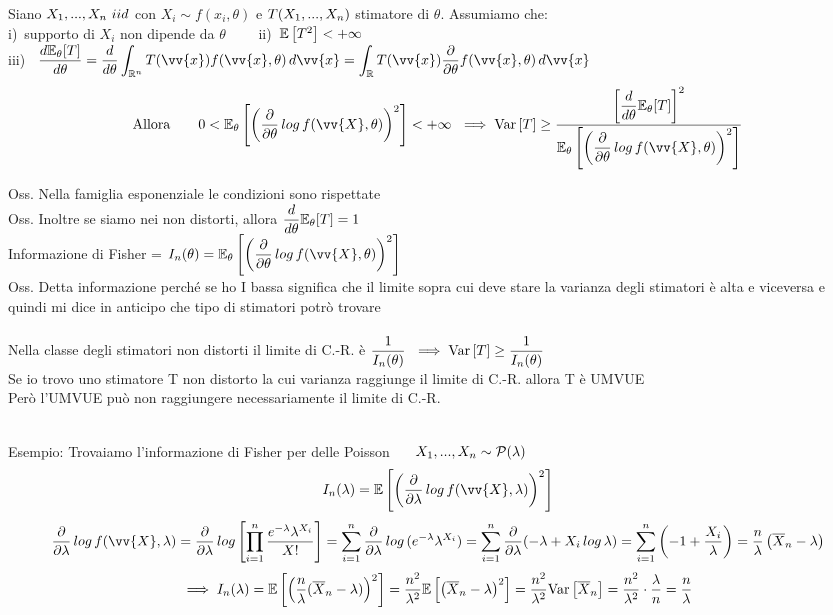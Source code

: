 \begin{teo}
Siano $X_1,...,X_n \ iid $ con $ X_i\sim f(x_i,\theta) $ e $ T(X_1,...,X_n)$ stimatore di $\theta$. Assumiamo che:\\
i)\ supporto di $X_i$ non dipende da $\theta$ \ \ \ \ ii)\ $\mathbb{E} \left[ T^2 \right]<+\infty$ \smallskip \\
iii) \ $\frac{d \EE_{\theta}[T]}{d\theta}=\frac{d}{d\theta}\displaystyle\int_{\R^n} T(\vv{x})f(\vv{x},\theta)\,d\vv{x}=\int_{\R}T(\vv{x})\frac{\partial}{\partial \theta}f(\vv{x},\theta)\,d\vv{x}$
\[ \text{Allora} \ \ \ \ \ \ 0<\EE_{\theta}\OO\O\frac{\partial}{\partial\theta}\,log \,f(\vv{X},\theta)\C^2\CC<+\infty \ \implies \var{T}\ge\frac{\OO\frac{d}{d\theta}\EE_{\theta}[T]\CC^2}{\EE_{\theta}\OO\O\frac{\partial}{\partial\theta}\,log\,f(\vv{X},\theta)\C^2\CC}\]
\end{teo}

%
Oss. Nella famiglia esponenziale le condizioni sono rispettate\\
Oss. Inoltre se siamo nei non distorti, allora  $\dfrac{d}{d\theta}\mathbb E_{\theta}[T] =1$\\

Informazione di Fisher = $I_n(\theta)=\EE_{\theta}\OO\O\frac{\partial}{\partial\theta}\,log\,f(\vv{X},\theta)\C^2\CC$\\
Oss. Detta informazione perché se ho I bassa significa che il limite sopra cui deve stare la varianza degli stimatori è alta e viceversa e quindi mi dice in anticipo che tipo di stimatori potrò trovare \\ \\

Nella classe degli stimatori non distorti il limite di C.-R. è $\dfrac{1}{I_n(\theta)} \ \implies \text{Var} \left[ T \right]\ge\dfrac{1}{I_n(\theta)}$\\

Se io trovo uno stimatore T non distorto la cui varianza raggiunge il limite di C.-R. allora T è UMVUE\\
Però l'UMVUE può non raggiungere necessariamente il limite di C.-R.\\ \\




Esempio: Trovaiamo l'informazione di Fisher per delle Poisson \ \ \ $X_1,...,X_n\sim\mathcal P(\lambda)$ \[I_n(\lambda)=\E{\O\frac{\partial}{\partial \lambda}\,log\,f(\vv{X},\lambda)\C^2}
\]
\[\frac{\partial}{\partial\lambda}\,log\,f(\vv{X},\lambda)=\frac{\partial}{\partial\lambda}\,log\OO\Prod{i=1}{n}\frac{e^{-\lambda}\lambda^{X_i}}{X!}\CC=\Sum{i=1}{n}\frac{\partial}{\partial\lambda}\,log\,(e^{-\lambda}\lambda^{X_i})=\Sum{i=1}{n}\frac{\partial}{\partial\lambda}(-\lambda+X_i\,log\,\lambda)=\Sum{i=1}{n}\O-1+\frac{X_i}{\lambda}\C=\frac{n}{\lambda}\O\overline{X}_n-\lambda\C\]
\[\implies I_n(\lambda)=\E{\O\frac{n}{\lambda}(\overline{X}_n-\lambda)\C^2}=\frac{n^2}{\lambda^2}\E{\O\overline{X}_n-\lambda\C^2} = \frac{n^2}{\lambda^2}\var{\overline{X}_n}=\frac{n^2}{\lambda^2}\cdot\frac{\lambda}{n}=\frac{n}{\lambda} \skipp\skipp\]


